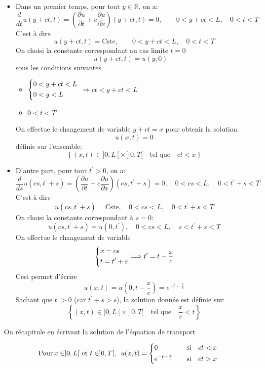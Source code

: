 \documentclass[
	french,
	11pt, %
]{fphw}
\newcommand{\hquad}{\hspace{0.5em}} %
\begin{document}
\begin{itemize}[label=$\blacksquare$]
	\item Dans un premier temps, pour tout $y \in \mathbb{R}$, on a:
$$
\frac{d}{dt} u(y+ct, t) = \left( \frac{\partial u}{\partial t} + c \frac{\partial u}{\partial x}\right)(y+ct,t)=0, \qquad 0 < y+ct < L, \quad 0 < t < T 
$$
C'est à dire 
$$u(y+ct, t) = \text{Cste}, \qquad 0 < y+ct < L, \quad 0 < t < T$$
On choisi la constante correspondant au cas limite $t=0$
$$
u(y+ct, t) = u(y,0) \quad $$
sous les conditions suivantes
\begin{itemize}
	\item 
	$
	\begin{dcases}
		0 < y+ct < L \\
		0 < y < L
	\end{dcases}
	$ $ \Longrightarrow ct < y+ct < L $
	\item $0 < t < T$
\end{itemize}  
On effectue le changement de variable $y+ct = x$ pour obtenir la solution 
$$u(x, t) = 0$$ 
définie sur l'ensemble:
$$
\left\{ (x,t) \in ]0, L[ \times ]0, T[ \quad \text{tel que} \quad ct < x \right\}
$$

\item 

D'autre part, pour tout $t^\prime > 0$, on a:
$$
\frac{d}{ds} u(cs, t^\prime + s) = \left( \frac{\partial u}{\partial t} + c \frac{\partial u}{\partial x}\right)(cs, t^\prime + s)=0, \quad 0 < cs < L, \quad 0 < t^\prime + s < T 
$$
C'est à dire
$$u(cs, t^\prime + s) = \text{Cste}, \quad 0 < cs < L, \quad 0 < t^\prime + s < T $$
On choisi la constante correspondant à $s=0$: 
$$u(cs, t^\prime + s) = u(0, t^\prime), \quad 0 < cs < L, \quad s < t^\prime + s < T $$
On effectue le changement de variable $$
	\begin{dcases}
		x = cs \\
		t = t^\prime + s
	\end{dcases} 
	\Longrightarrow t^\prime = t - \frac{x}{c} $$   
Ceci permet d'écrire
$$ u(x,t) = u(0, t - \frac{x}{c}) = e^{-t + \frac{x}{c}}$$ 
Sachant que $t^\prime > 0$ (car $t^\prime +s > s$), la solution donnée est définie sur:
$$\left\{ (x,t) \in ]0, L[ \times ]0, T[ \quad \text{tel que} \quad \frac{x}{c} < t \right\}$$

\end{itemize}

On récapitule en écrivant la solution de l'équation de transport

$$
\text{Pour} \, x \in ]0, L[ \text{  et  } t \in ]0, T[, \hquad u(x,t) = 
\begin{dcases}
	0 & \quad \text{si} \quad  ct < x\\
	e^{-t + \frac{x}{c}} & \quad \text{si} \quad ct > x
\end{dcases} 
$$
\end{document}
